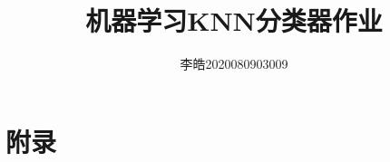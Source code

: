 \documentclass[lang=cn,11pt,a4paper,cite=authoryear]{elegantpaper}
\title{机器学习KNN分类器作业}
\author{李皓\hspace{10pt}2020080903009}
\institute{电子科技大学计算机学院}
\date{\zhtoday}
\begin{document}
\maketitle

    \newpage
    \section{附录}
\end{document}
